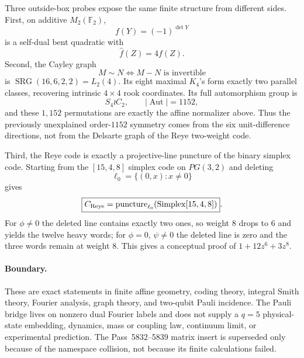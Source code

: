 Three outside-box probes expose the same finite structure from different sides.
First, on additive $M_2(\mathbb F_2)$,
\[
f(Y)=(-1)^{\det Y}
\]
is a self-dual bent quadratic with
\[
\boxed{\widehat f(Z)=4f(Z)}.
\]
Second, the Cayley graph
\[
M\sim N\iff M-N\text{ is invertible}
\]
is $\operatorname{SRG}(16,6,2,2)=L_2(4)$.  Its eight maximal $K_4$'s form
exactly two parallel classes, recovering intrinsic $4\times4$ rook coordinates.
Its full automorphism group is
\[
\boxed{S_4\wr C_2},\qquad |\operatorname{Aut}|=1152,
\]
and these $1{,}152$ permutations are exactly the affine normalizer above.
Thus the previously unexplained order-$1152$ symmetry comes from the six
unit-difference directions, not from the Delsarte graph of the Reye two-weight
code.

Third, the Reye code is exactly a projective-line puncture of the binary simplex
code.  Starting from the $[15,4,8]$ simplex code on $PG(3,2)$ and deleting
\[
\ell_0=\{(0,x):x\ne0\}
\]
gives
\[
\boxed{C_{\rm Reye}=\operatorname{puncture}_{\ell_0}
(\mathrm{Simplex}[15,4,8])}.
\]
For $\phi\ne0$ the deleted line contains exactly two ones, so weight $8$ drops
to $6$ and yields the twelve heavy words; for $\phi=0$, $\psi\ne0$ the deleted
line is zero and the three words remain at weight $8$.  This gives a conceptual
proof of $1+12z^6+3z^8$.

\paragraph{Boundary.}
These are exact statements in finite affine geometry, coding theory, integral
Smith theory, Fourier analysis, graph theory, and two-qubit Pauli incidence.
The Pauli bridge lives on nonzero dual Fourier labels and does not supply a
$q=5$ physical-state embedding, dynamics, mass or coupling law, continuum limit,
or experimental prediction.  The Pass~5832--5839 matrix insert is superseded
only because of the namespace collision, not because its finite calculations failed.
